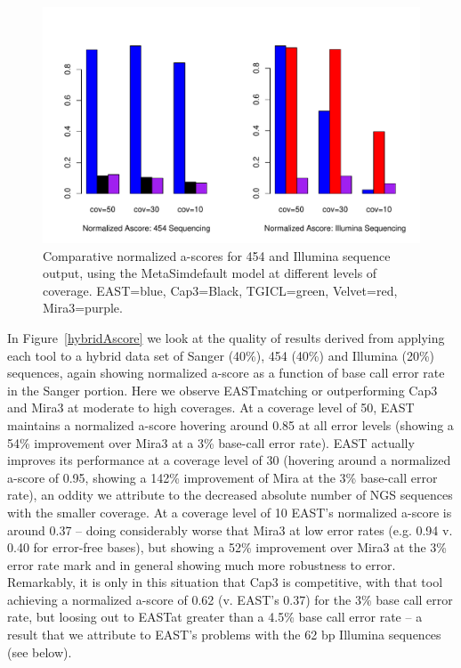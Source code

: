 \documentclass[10pt]{bmc_article}
\newcommand{\capthree} {{\small Cap3}}
\newcommand{\metasim} {{\small MetaSim}}
\newcommand{\tgicl} {{\small TGICL}}
\newcommand{\east} {{\small EAST}}
\newcommand{\velvet}{{\small Velvet}}
\newcommand{\mira}{{\small Mira3}}
\newenvironment{bmcformat}{\begin{raggedright}\baselineskip20pt\sloppy\setboolean{publ}{false}}{\end{raggedright}\baselineskip20pt\sloppy}
\begin{document}
\begin{bmcformat}
\begin{figure}[htb]
\centerline{\includegraphics[width=6in]{pics.d/ascore_nxtgen.pdf}}
\caption{Comparative normalized a-scores for 454 and Illumina sequence
  output, using the \metasim default model at different levels
  of coverage.  \east=blue, \capthree=Black, \tgicl=green,
  \velvet=red, \mira=purple.  }
\label{nextgenAscore}
\end{figure}

 In Figure~\ref{hybridAscore} we look at the
quality of results derived from applying each tool to a hybrid data
set of Sanger (40\%), 454 (40\%) and Illumina (20\%) sequences, again
showing normalized a-score as a function of base call error rate in
the Sanger portion.  Here we observe \east matching or outperforming
\capthree\/ and \mira\/ at moderate to high coverages.  At a coverage
level of 50, \east\/ maintains a normalized a-score hovering around
0.85 at all error levels (showing a 54\% improvement over \mira\/ at a
3\% base-call error rate).  \east\/ actually improves its performance
at a coverage level of 30 (hovering around a normalized a-score of
0.95, showing a 142\% improvement of Mira at the 3\% base-call error
rate), an oddity we attribute to the decreased absolute number of NGS
sequences with the smaller coverage.  At a coverage level of 10
\east's normalized a-score is around 0.37 -- doing considerably worse
that \mira\/ at low error rates (e.g. 0.94 v. 0.40 for error-free
bases), but showing a 52\% improvement over \mira\/ at the 3\% error
rate mark and in general showing much more robustness to error.
Remarkably, it is only in this situation that \capthree\/ is
competitive, with that tool achieving a normalized a-score of 0.62
(v. \east's 0.37) for the 3\% base call error rate, but loosing out to
\east at greater than a 4.5\% base call error rate -- a result that we
attribute to \east's problems with the 62 bp Illumina sequences (see below).


\end{bmcformat}
\end{document}
